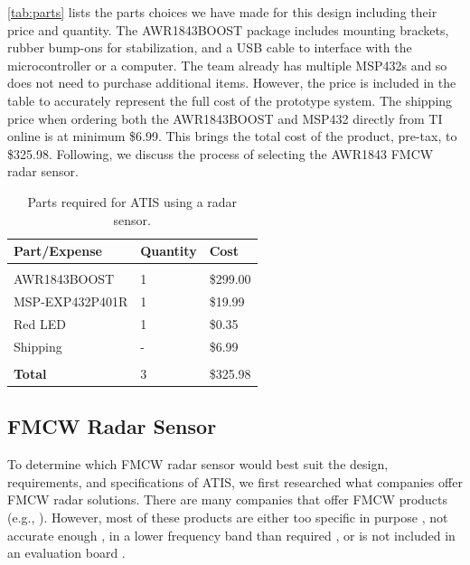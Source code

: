 \documentclass[11pt]{IEEEtran}
\begin{document}
		\autoref{tab:parts} lists the parts choices we have made for this design including their price and quantity. The AWR1843BOOST package includes mounting brackets, rubber bump-ons for stabilization, and a USB cable to interface with the microcontroller or a computer. The team already has multiple MSP432s and so does not need to purchase additional items. However, the price is included in the table to accurately represent the full cost of the prototype system. The shipping price when ordering both the AWR1843BOOST and MSP432 directly from TI online is at minimum \$6.99. This brings the total cost of the product, pre-tax, to \$325.98. Following, we discuss the process of selecting the AWR1843 FMCW radar sensor. 

		\begin{table}[t]
			\begin{center}
				\caption{Parts required for ATIS using a radar sensor.}
				\label{tab:parts}
				\begin{tabular}{l|l|l}
					Part/Expense		& Quantity 	& Cost  	\\
					\hline
					\vspace{-0.1in}		&			&			\\
					AWR1843BOOST 		& 1 		& \$299.00	\\
					MSP-EXP432P401R		& 1 		& \$19.99	\\
					Red LED 			& 1 		& \$0.35	\\
					Shipping 			& -			& \$6.99 	\\
					\hline
					\vspace{-0.1in}		&			&			\\
					\textbf{Total} 		& 3			& \$325.98
				\end{tabular}
			\end{center}
		\end{table}

		\subsection{FMCW Radar Sensor}
			\label{ssec:FMCW}
			To determine which FMCW radar sensor would best suit the design, requirements, and specifications of ATIS, we first researched what companies offer FMCW radar solutions. There are many companies that offer FMCW products (e.g., \cite{fluidic,liteye,houston,analog,nxp}). However, most of these products are either too specific in purpose \cite{liteye}, not accurate enough \cite{houston}, in a lower frequency band than required \cite{analog}, or is not included in an evaluation board \cite{nxp}. 
\end{document}
